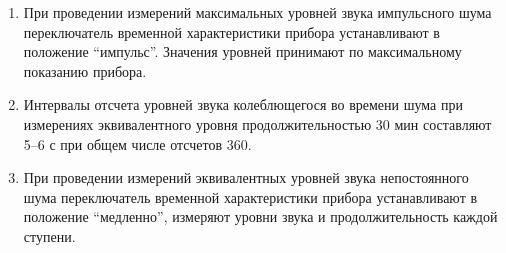 \documentclass[a5paper, 12pt, twoside]{article}
\begin{document}
\begin{enumerate}
    \item При проведении измерений максимальных уровней звука импульсного шума переключатель временной характеристики прибора устанавливают в положение ``импульс''. Значения уровней принимают по максимальному показанию прибора.
    \item Интервалы отсчета уровней звука колеблющегося во времени шума при измерениях эквивалентного уровня продолжительностью 30 мин составляют 5–6 с при общем числе отсчетов 360.
    \item При проведении измерений эквивалентных уровней звука непостоянного шума переключатель временной характеристики прибора устанавливают в положение ``медленно'', измеряют уровни звука и продолжительность каждой ступени.
\end{enumerate}
\end{document}
